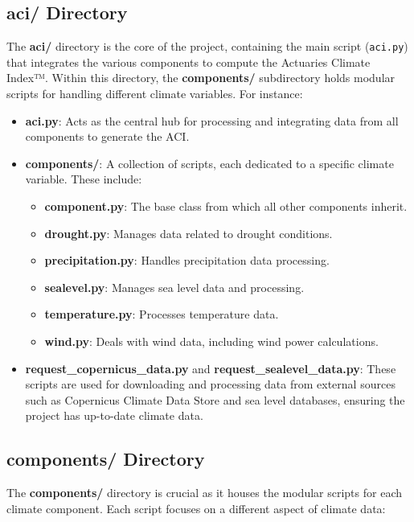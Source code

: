 \documentclass[a4paper,12pt]{article}
\begin{document}
\subsection{aci/ Directory}
The \textbf{aci/} directory is the core of the project, containing the main script (\texttt{aci.py}) that integrates the various components to compute the Actuaries Climate Index™. Within this directory, the \textbf{components/} subdirectory holds modular scripts for handling different climate variables. For instance:

\begin{itemize}
    \item \textbf{aci.py}: Acts as the central hub for processing and integrating data from all components to generate the ACI.
    \item \textbf{components/}: A collection of scripts, each dedicated to a specific climate variable. These include:
    \begin{itemize}
        \item \textbf{component.py}: The base class from which all other components inherit.
        \item \textbf{drought.py}: Manages data related to drought conditions.
        \item \textbf{precipitation.py}: Handles precipitation data processing.
        \item \textbf{sealevel.py}: Manages sea level data and processing.
        \item \textbf{temperature.py}: Processes temperature data.
        \item \textbf{wind.py}: Deals with wind data, including wind power calculations.
    \end{itemize}
    \item \textbf{request\_copernicus\_data.py} and \textbf{request\_sealevel\_data.py}: These scripts are used for downloading and processing data from external sources such as Copernicus Climate Data Store and sea level databases, ensuring the project has up-to-date climate data.
\end{itemize}

\subsection{components/ Directory}
The \textbf{components/} directory is crucial as it houses the modular scripts for each climate component. Each script focuses on a different aspect of climate data:
\end{document}
